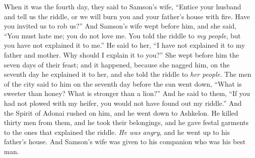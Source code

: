 \begin{biblechapter}
\verse When it was the fourth day, they said to Samson’s wife, “Entice your husband and tell us the riddle, or we will burn you and your father’s house with fire. Have you invited us to rob us?”
\verse And Samson’s wife wept before him, and she said, “You must hate me; you do not love me. You told the riddle to \textit{my people}, but you have not explained it to me.” He said to her, “I have not explained it to my father and mother. Why should I explain it to you?”
\verse She wept before him the seven days of their feast; and it happened, because she nagged him, on the seventh day he explained it to her, and she told the riddle to \textit{her people}.
\verse The men of the city said to him on the seventh day before the sun went down, “What is sweeter than honey? 
What is stronger than a lion?” And he said to them, “If you had not plowed with my heifer, 
you would not have found out my riddle.”
\verse And the Spirit of Adonai rushed on him, and he went down to Ashkelon. He killed thirty men from them, and he took their belongings, and he gave festal garments to the ones that explained the riddle. \textit{He was angry}, and he went up to his father’s house.
\verse And Samson’s wife was given to his companion who was his best man.
\end{biblechapter}

